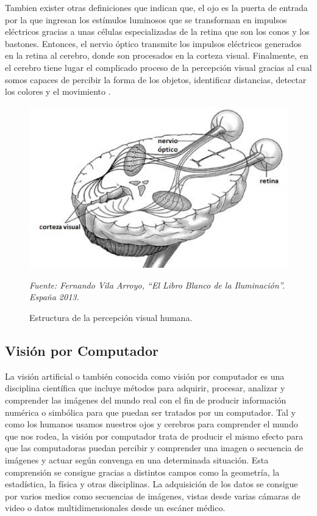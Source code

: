 Tambien exister otras definiciones que indican que, el ojo es la puerta de entrada por la que ingresan los estímulos luminosos que se transforman en impulsos eléctricos gracias a unas células especializadas de la retina que son los conos y los bastones. Entonces, el nervio óptico transmite los impulsos eléctricos generados en la retina al cerebro, donde son procesados en la corteza visual. Finalmente, en el cerebro tiene lugar el complicado proceso de la percepción visual gracias al cual somos capaces de percibir la forma de los objetos, identificar distancias, detectar los colores y el movimiento \cite{14alonso2005personas}.


        \begin{figure}[H]
		\centering
		\includegraphics[width=120mm]{./Imagenes/estructura_percepcion.png}
		\caption{Estructura de la percepción visual humana.}
		\vspace{0.15cm}
		\textit{Fuente: Fernando Vila Arroyo, “El Libro Blanco de la Iluminación”. España 2013.}
		\label{fig:estructura_percepcion}
		\end{figure}      	  

\subsection{Visión por Computador}
La visión artificial o también conocida como visión por computador es una disciplina científica que incluye métodos para adquirir, procesar, analizar y comprender las imágenes del mundo real con el fin de producir información numérica o simbólica para que puedan ser tratados por un computador. Tal y como los humanos usamos nuestros ojos y cerebros para comprender el mundo que nos rodea, la visión por computador trata de producir el mismo efecto para que las computadoras puedan percibir y comprender una imagen o secuencia de imágenes y actuar según convenga en una determinada situación. Esta comprensión se consigue gracias a distintos campos como la geometría, la estadística, la física y otras disciplinas. La adquisición de los datos se consigue por varios medios como secuencias de imágenes, vistas desde varias cámaras de video o datos multidimensionales desde un
escáner médico.

